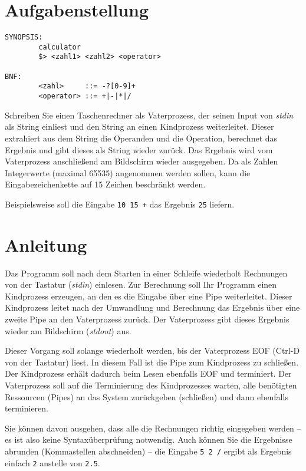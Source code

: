 




\section*{Aufgabenstellung}

\begin{verbatim}
SYNOPSIS:
        calculator
        $> <zahl1> <zahl2> <operator>

BNF:
        <zahl>     ::= -?[0-9]+
        <operator> ::= +|-|*|/

\end{verbatim}

Schreiben Sie einen Taschenrechner als Vaterprozess, der seinen Input
von \emph{stdin} als String einliest und den String an einen
Kindprozess weiterleitet. Dieser extrahiert aus dem String die
Operanden und die Operation, berechnet das Ergebnis und gibt dieses
als String wieder zurück. Das Ergebnis wird vom Vaterprozess
anschließend am Bildschirm wieder ausgegeben. Da als Zahlen
Integerwerte (maximal 65535) angenommen werden sollen, kann die
Eingabezeichenkette auf 15 Zeichen beschränkt werden.


Beispielsweise soll die Eingabe \verb_10 15 +_ das Ergebnis \verb_25_
liefern.

\section*{Anleitung}

Das Programm soll nach dem Starten in einer Schleife wiederholt
Rechnungen von der Tastatur (\emph{stdin}) einlesen. Zur
Berechnung soll Ihr Programm einen Kindprozess erzeugen, an den
es die Eingabe über eine Pipe weiterleitet. Dieser Kindprozess
leitet nach der Umwandlung und Berechnung das Ergebnis über eine
zweite Pipe an den Vaterprozess zurück. Der Vaterprozess
gibt dieses Ergebnis wieder am Bildschirm (\emph{stdout}) aus.


Dieser Vorgang soll solange wiederholt werden, bis der Vaterprozess
EOF (Ctrl-D von der Tastatur) liest. In diesem Fall ist die Pipe zum
Kindprozess zu schließen. Der Kindprozess erhält dadurch beim Lesen
ebenfalls EOF und terminiert. Der Vaterprozess soll auf die
Terminierung des Kindprozesses warten, alle benötigten Ressourcen
(Pipes) an das System zurückgeben (schließen) und dann ebenfalls
terminieren.


Sie können davon ausgehen, dass alle die Rechnungen richtig eingegeben
werden – es ist also keine Syntaxüberprüfung notwendig. Auch können
Sie die Ergebnisse abrunden (Kommastellen abschneiden) – die Eingabe
\verb_5 2 /_ ergibt als Ergebnis einfach \verb_2_ anstelle von
\verb_2.5_.

\osueguidelinestwo


